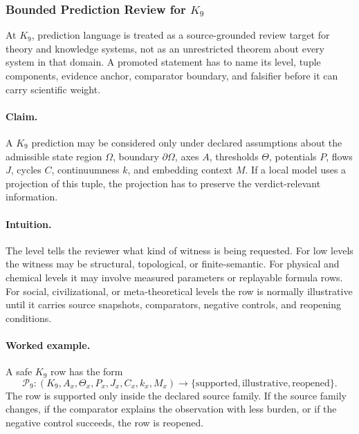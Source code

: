 \subsubsection{Bounded Prediction Review for \texorpdfstring{$K_9$}{K_9}}
\label{sec:predictions-k9-r014}

At \(K_9\), prediction language is treated as a source-grounded review
target for theory and knowledge systems, not as an unrestricted theorem about every system in that
domain. A promoted statement has to name its level, tuple components, evidence
anchor, comparator boundary, and falsifier before it can carry scientific
weight.

\paragraph{Claim.}
A \(K_9\) prediction may be considered only under declared assumptions
about the admissible state region \(\Omega\), boundary \(\partial\Omega\), axes
\(A\), thresholds \(\Theta\), potentials \(P\), flows \(J\), cycles \(C\),
continuumness \(k\), and embedding context \(M\). If a local model uses a
projection of this tuple, the projection has to preserve the verdict-relevant
information.

\paragraph{Intuition.}
The level tells the reviewer what kind of witness is being requested. For low
levels the witness may be structural, topological, or finite-semantic. For
physical and chemical levels it may involve measured parameters or replayable
formula rows. For social, civilizational, or meta-theoretical levels the row is
normally illustrative until it carries source snapshots, comparators, negative
controls, and reopening conditions.

\paragraph{Worked example.}
A safe \(K_9\) row has the form
\[
  \mathcal{P}_{9}:
  (K_9, A_x, \Theta_x, P_x, J_x, C_x, k_x, M_x)
  \longrightarrow
  \{\mathrm{supported},\mathrm{illustrative},\mathrm{reopened}\}.
\]
The row is supported only inside the declared source family. If the source
family changes, if the comparator explains the observation with less burden, or
if the negative control succeeds, the row is reopened.

